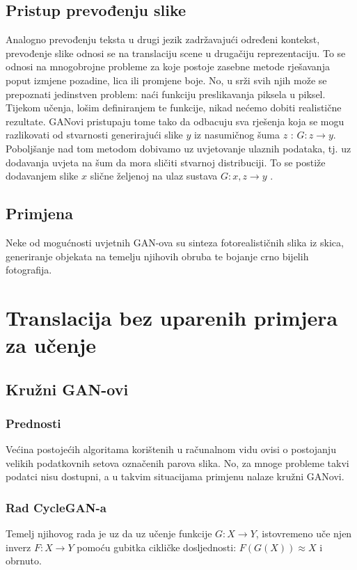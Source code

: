 \documentclass[lmodern, utf8, seminar]{fer}
\begin{document}
\section{Pristup prevođenju slike}
Analogno prevođenju teksta u drugi jezik zadržavajući određeni kontekst, prevođenje slike odnosi se na translaciju scene u drugačiju reprezentaciju. To se odnosi na mnogobrojne probleme za koje postoje zasebne metode rješavanja poput izmjene pozadine, lica ili promjene boje. No, u srži svih njih može se prepoznati jedinstven problem: naći funkciju preslikavanja piksela u piksel. Tijekom učenja, lošim definiranjem te funkcije, nikad nećemo dobiti realistične rezultate. GANovi pristupaju tome tako da odbacuju sva rješenja koja se mogu razlikovati od stvarnosti generirajući slike $y$ iz nasumičnog šuma $z$ : $G: z \rightarrow y$. Poboljšanje nad tom metodom dobivamo uz uvjetovanje ulaznih podataka, tj. uz dodavanja uvjeta na šum da mora sličiti stvarnoj distribuciji. To se postiže dodavanjem slike $x$ slične željenoj na ulaz sustava $G: {x,z} \rightarrow y$ \cite{isola2017image}.

\section{Primjena}
Neke od mogućnosti uvjetnih GAN-ova su sinteza fotorealističnih slika iz skica, generiranje objekata na temelju njihovih obruba te bojanje crno bijelih fotografija.




\chapter{Translacija bez uparenih primjera za učenje}
\section{Kružni GAN-ovi}

\subsection{Prednosti}
Većina postojećih algoritama korištenih u računalnom vidu ovisi o postojanju velikih podatkovnih setova označenih parova slika. No, za mnoge probleme takvi podatci nisu dostupni, a u takvim situacijama primjenu nalaze kružni GANovi.
\newline

\subsection{Rad CycleGAN-a}
Temelj njihovog rada je uz da uz učenje funkcije $G: X \rightarrow Y$, istovremeno uče njen inverz $F: X \rightarrow Y$ pomoću gubitka cikličke dosljednosti: $F(G(X)) \approx X$ i obrnuto.
\end{document}
